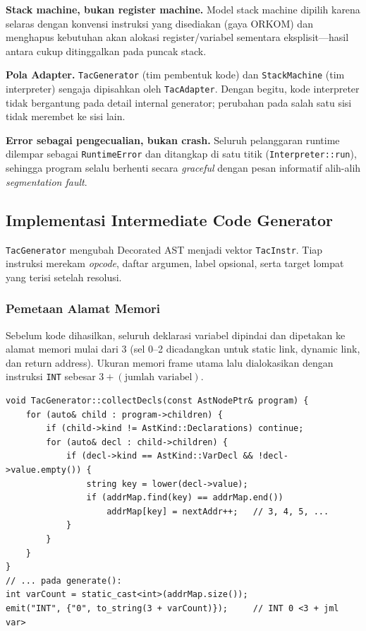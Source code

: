 \textbf{Stack machine, bukan register machine.} Model stack machine dipilih karena
selaras dengan konvensi instruksi yang disediakan (gaya ORKOM) dan menghapus
kebutuhan akan alokasi register/variabel sementara eksplisit---hasil antara cukup
ditinggalkan pada puncak stack.

\textbf{Pola Adapter.} \texttt{TacGenerator} (tim pembentuk kode) dan
\texttt{StackMachine} (tim interpreter) sengaja dipisahkan oleh
\texttt{TacAdapter}. Dengan begitu, kode interpreter tidak bergantung pada detail
internal generator; perubahan pada salah satu sisi tidak merembet ke sisi lain.

\textbf{Error sebagai pengecualian, bukan crash.} Seluruh pelanggaran runtime
dilempar sebagai \texttt{RuntimeError} dan ditangkap di satu titik
(\texttt{Interpreter::run}), sehingga program selalu berhenti secara \emph{graceful}
dengan pesan informatif alih-alih \emph{segmentation fault}.

\subsection{Implementasi Intermediate Code Generator}

\texttt{TacGenerator} mengubah Decorated AST menjadi vektor \texttt{TacInstr}.
Tiap instruksi merekam \emph{opcode}, daftar argumen, label opsional, serta target
lompat yang terisi setelah resolusi.

\subsubsection{Pemetaan Alamat Memori}

Sebelum kode dihasilkan, seluruh deklarasi variabel dipindai dan dipetakan ke
alamat memori mulai dari 3 (sel 0--2 dicadangkan untuk static link, dynamic link,
dan return address). Ukuran memori frame utama lalu dialokasikan dengan instruksi
\texttt{INT} sebesar $3 + (\text{jumlah variabel})$.

\begin{lstlisting}[style=kodeCpp, caption={Pemetaan alamat variabel dan alokasi memori awal.}]
void TacGenerator::collectDecls(const AstNodePtr& program) {
    for (auto& child : program->children) {
        if (child->kind != AstKind::Declarations) continue;
        for (auto& decl : child->children) {
            if (decl->kind == AstKind::VarDecl && !decl->value.empty()) {
                string key = lower(decl->value);
                if (addrMap.find(key) == addrMap.end())
                    addrMap[key] = nextAddr++;   // 3, 4, 5, ...
            }
        }
    }
}
// ... pada generate():
int varCount = static_cast<int>(addrMap.size());
emit("INT", {"0", to_string(3 + varCount)});     // INT 0 <3 + jml var>
\end{lstlisting}

